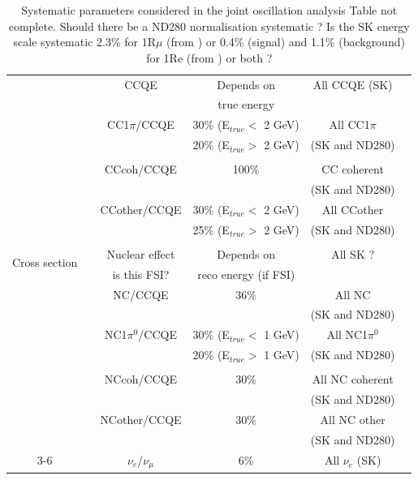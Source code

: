 \begin{table}[h]
\begin{tabular}{|c|c|c|c|c|c|}
\hline
\multirow{21}{*}{Cross section} & \multirow{12}{*}{{\color{red}{1R$\mu$ + 1Re?}}} & CCQE & Depends on  & All CCQE (SK) & \\
 & & & true energy \cite{NIWGErrors} &  &  \\
\cline{3-6}
 & & CC1$\pi$/CCQE & 30\% (E$_{true}$$<$ 2 GeV) & All CC1$\pi$  &  \\
 & & & 20\% (E$_{true}$$>$ 2 GeV) & (SK and ND280)  &  \\
 & & & \cite{NIWGErrors} &  &  \\
\cline{3-6}
 & & CCcoh/CCQE & 100\% \cite{NIWGErrors}  & CC coherent  &  \\
  & & & & (SK and ND280) &  \\
\cline{3-6}
 & & CCother/CCQE & 30\% (E$_{true}$$<$ 2 GeV)  & All CCother  &  \\
 & & & 25\% (E$_{true}$$>$ 2 GeV)  & (SK and ND280) &  \\
 & & & \cite{NIWGErrors} &  &  \\
\cline{3-6}
 & & Nuclear effect & Depends on & {\color{red} All SK ?}&  \\
  & & {\color{red} is this FSI?} & reco energy {\color{red} (if FSI)} &  &  \\
\cline{2-6}
 & \multirow{2}{*}{{\color{red}{1R$\mu$ only?}}} & NC/CCQE & 36\% \cite{NIWGErrors} & All NC &  \\
 & & &  & (SK and ND280) &  \\
\cline{2-6}
  & \multirow{8}{*}{{\color{red}{1Re only?}}} & NC1$\pi^{0}$/CCQE & 30\% (E$_{true}$$<$ 1 GeV) & All NC1$\pi^{0}$ &  \\
  & & & 20\% (E$_{true}$$>$ 1 GeV) & (SK and ND280) &  \\
 & & & \cite{NIWGErrors} &  &  \\
\cline{3-6}
  & & NCcoh/CCQE & 30\% \cite{NIWGErrors} & All NC coherent &  \\
  & & & & (SK and ND280) &  \\
\cline{3-6}
  & & NCother/CCQE & 30\% \cite{NIWGErrors} & All NC other &  \\
  & & & & (SK and ND280) &  \\
\cline{3-6}
 & & $\nu_{e}$/$\nu_{\mu}$ & 6\% \cite{NIWGErrors} & All $\nu_{e}$ (SK) &  \\
\hline
\end{tabular}
\caption{Systematic parameters considered in the joint oscillation analysis 
{\color{red}Table not complete. Should there be a ND280 normalisation systematic ? Is the SK energy scale systematic 2.3\% for 1R$\mu$ 
(from \cite{TN065}) or 0.4\% (signal) and 1.1\% (background) for 1Re (from \cite{NueRun1and2Analysis}) or both ? }}
\label{tab:systematicslist}
\end{table}

